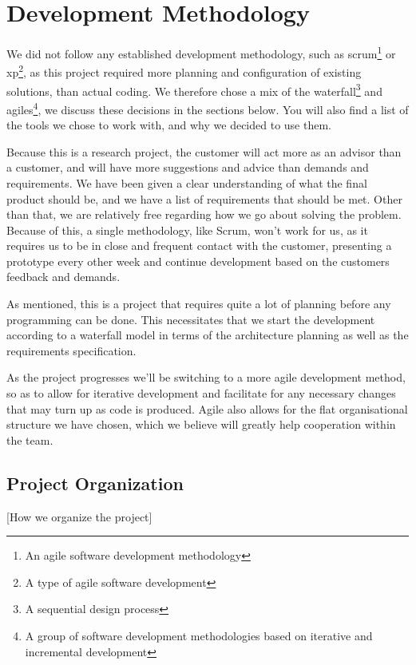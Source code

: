    
\section{Development Methodology}\label{Development Methodology} 
    We did not follow any established development methodology, such as \gls{scrum}\footnote{An agile software development methodology} or \gls{xp}\footnote{A type of agile software development}, as this project required more planning and configuration of existing solutions, than actual coding. We therefore chose a mix of the \gls{waterfall}\footnote{A sequential design process} and \glspl{agile}\footnote{A group of software development methodologies based on iterative and incremental development}, we discuss these decisions in the sections below. You will also find a list of the tools we chose to work with, and why we decided to use them. 
    
    Because this is a research project, the customer will act more as an advisor than a customer, and will have more suggestions and advice than demands and requirements. We have been given a clear understanding of what the final product should be, and we have a list of requirements that should be met. Other than that, we are relatively free regarding how we go about solving the problem. Because of this, a single methodology, like Scrum, won't work for us, as it requires us to be in close and frequent contact with the customer, presenting a prototype every other week and continue development based on the customers feedback and demands.
    
    As mentioned, this is a project that requires quite a lot of planning before any programming can be done. This necessitates that we start the development according to a waterfall model in terms of the architecture planning as well as the requirements specification.
    
    As the project progresses we’ll be switching to a more agile development method, so as to allow for iterative development and facilitate for any necessary changes that may turn up as code is produced. Agile also allows for the flat organisational structure we have chosen, which we believe will greatly help cooperation within the team.

    \subsection{Project Organization}\label{Project Organization}[How we organize the project]
    
